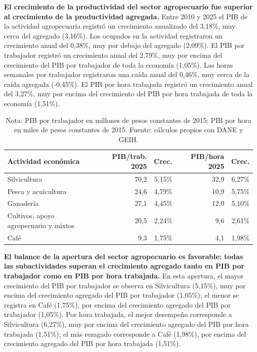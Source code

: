 \textbf{El crecimiento de la productividad del sector agropecuario fue superior al crecimiento de la productividad agregada.} Entre 2010 y 2025 el PIB de la actividad agropecuaria registró un crecimiento anualizado del 3,18\%, muy cerca del agregado (3,16\%). Los ocupados en la actividad registraron un crecimiento anual del 0,38\%, muy por debajo del agregado (2,09\%). El PIB por trabajador registró un crecimiento anual del 2,79\%, muy por encima del crecimiento del PIB por trabajador de toda la economía (1,05\%). Las horas semanales por trabajador registraron una caída anual del 0,46\%, muy cerca de la caída agregada (-0,45\%). El PIB por hora trabajada registró un crecimiento anual del 3,27\%, muy por encima del crecimiento del PIB por hora trabajada de toda la economía (1,51\%).

\begin{table}[H]
\centering
\caption{Productividad laboral de las actividades agropecuarias, 2010--2025}
\label{tab:sector_a_zoom61}
\small
\begin{tabular}{p{}rrrr}
\toprule
Actividad económica & PIB/trab. 2025 & Crec. & PIB/hora 2025 & Crec. \\
\midrule
Silvicultura & 70,2 & 5,15\% & 32,9 & 6,27\% \\
Pesca y acuicultura & 24,6 & 4,79\% & 10,9 & 5,75\% \\
Ganadería & 27,1 & 4,45\% & 12,0 & 5,10\% \\
Cultivos, apoyo agropecuario y mixtos & 20,5 & 2,24\% & 9,6 & 2,61\% \\
Café & 9,3 & 1,75\% & 4,1 & 1,98\% \\
\bottomrule
\end{tabular}
\caption*{\footnotesize Nota: PIB por trabajador en millones de pesos constantes de 2015; PIB por hora en miles de pesos constantes de 2015. %
Fuente: cálculos propios con DANE y GEIH.}
\end{table}

\textbf{El balance de la apertura del sector agropecuario es favorable: todas las subactividades superan el crecimiento agregado tanto en PIB por trabajador como en PIB por hora trabajada.} En esta apertura, el mayor crecimiento del PIB por trabajador se observa en Silvicultura (5,15\%), muy por encima del crecimiento agregado del PIB por trabajador (1,05\%); el menor se registra en Café (1,75\%), por encima del crecimiento agregado del PIB por trabajador (1,05\%). Por hora trabajada, el mejor desempeño corresponde a Silvicultura (6,27\%), muy por encima del crecimiento agregado del PIB por hora trabajada (1,51\%); el más rezagado corresponde a Café (1,98\%), por encima del crecimiento agregado del PIB por hora trabajada (1,51\%).

